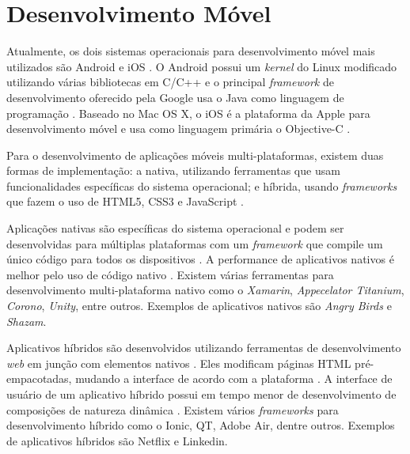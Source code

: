\section{Desenvolvimento Móvel}

Atualmente, os dois sistemas operacionais para desenvolvimento móvel mais utilizados são Android e iOS \cite{gartner-top-os}. O Android possui um \textit{kernel} do Linux modificado utilizando várias bibliotecas em C/C++ \cite{mobile-dev} e o principal \textit{framework} de desenvolvimento oferecido pela Google usa o Java como linguagem de programação \cite{android}. Baseado no Mac OS X, o iOS é a plataforma da Apple para desenvolvimento móvel e usa como linguagem primária o Objective-C \cite{mobile-dev}.

Para o desenvolvimento de aplicações móveis multi-plataformas, existem duas formas de implementação: a nativa, utilizando ferramentas que usam funcionalidades específicas do sistema operacional; e híbrida, usando \textit{frameworks} que fazem o uso de HTML5, CSS3 e JavaScript \cite{mobile-dev-2}.

Aplicações nativas são específicas do sistema operacional e podem ser desenvolvidas para múltiplas plataformas com um \textit{framework} que compile um único código para todos os dispositivos \cite{hybrid-1}. A performance de aplicativos nativos é melhor pelo uso de código nativo \cite{hybrid-2}. Existem várias ferramentas para desenvolvimento multi-plataforma nativo como o \textit{Xamarin}, \textit{Appecelator Titanium}, \textit{Corono}, \textit{Unity}, entre outros. Exemplos de aplicativos nativos são \textit{Angry Birds} e \textit{Shazam}.

Aplicativos híbridos são desenvolvidos utilizando ferramentas de desenvolvimento \textit{web} em junção com elementos nativos \cite{hybrid-1}. Eles modificam páginas HTML pré-empacotadas, mudando a interface de acordo com a plataforma \cite{hybrid-2}. A interface de usuário de um aplicativo híbrido possui em tempo menor de desenvolvimento de composições de natureza dinâmica \cite{mobile-dev-2}. Existem vários \textit{frameworks} para desenvolvimento híbrido como o Ionic, QT, Adobe Air, dentre outros. Exemplos de aplicativos híbridos são Netflix e Linkedin.
